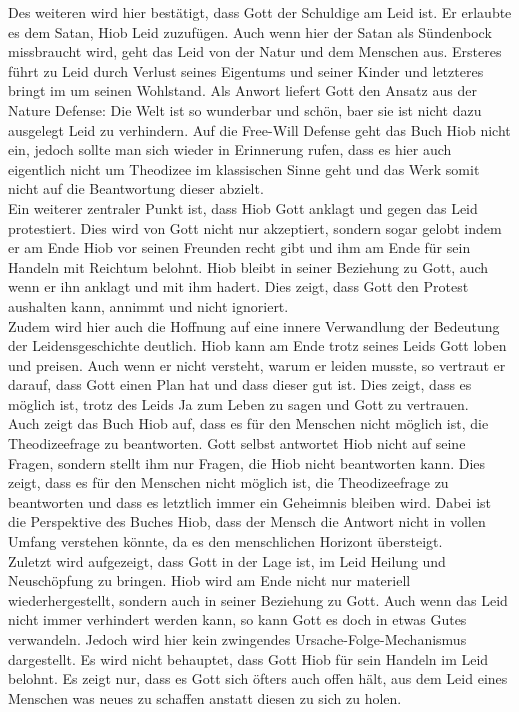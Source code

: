 Des weiteren wird hier bestätigt, dass Gott der Schuldige am Leid ist. Er erlaubte es dem Satan, Hiob Leid zuzufügen. Auch wenn hier der Satan als Sündenbock missbraucht wird, geht das Leid von der Natur und dem Menschen aus. Ersteres führt zu Leid durch Verlust seines Eigentums und seiner Kinder und letzteres bringt im um seinen Wohlstand. Als Anwort liefert Gott den Ansatz aus der Nature Defense: Die Welt ist so wunderbar und schön, baer sie ist nicht dazu ausgelegt Leid zu verhindern. Auf die Free-Will Defense geht das Buch Hiob nicht ein, jedoch sollte man sich wieder in Erinnerung rufen, dass es hier auch eigentlich nicht um Theodizee im klassischen Sinne geht und das Werk somit nicht auf die Beantwortung dieser abzielt. \\

Ein weiterer zentraler Punkt ist, dass Hiob Gott anklagt und gegen das Leid protestiert. Dies wird von Gott nicht nur akzeptiert, sondern sogar gelobt indem er am Ende Hiob vor seinen Freunden recht gibt und ihm am Ende für sein Handeln mit Reichtum belohnt. Hiob bleibt in seiner Beziehung zu Gott, auch wenn er ihn anklagt und mit ihm hadert. Dies zeigt, dass Gott den Protest aushalten kann, annimmt und nicht ignoriert. \\

Zudem wird hier auch die Hoffnung auf eine innere Verwandlung der Bedeutung der Leidensgeschichte deutlich. Hiob kann am Ende trotz seines Leids Gott loben und preisen. Auch wenn er nicht versteht, warum er leiden musste, so vertraut er darauf, dass Gott einen Plan hat und dass dieser gut ist. Dies zeigt, dass es möglich ist, trotz des Leids Ja zum Leben zu sagen und Gott zu vertrauen.\\

Auch zeigt das Buch Hiob auf, dass es für den Menschen nicht möglich ist, die Theodizeefrage zu beantworten. Gott selbst antwortet Hiob nicht auf seine Fragen, sondern stellt ihm nur Fragen, die Hiob nicht beantworten kann. Dies zeigt, dass es für den Menschen nicht möglich ist, die Theodizeefrage zu beantworten und dass es letztlich immer ein Geheimnis bleiben wird. Dabei ist die Perspektive des Buches Hiob, dass der Mensch  die Antwort nicht in vollen Umfang verstehen könnte, da es den menschlichen Horizont übersteigt.\\

Zuletzt wird aufgezeigt, dass Gott in der Lage ist, im Leid Heilung und Neuschöpfung zu bringen. Hiob wird am Ende nicht nur materiell wiederhergestellt, sondern auch in seiner Beziehung zu Gott. Auch wenn das Leid nicht immer verhindert werden kann, so kann Gott es doch in etwas Gutes verwandeln. Jedoch wird hier kein zwingendes Ursache-Folge-Mechanismus dargestellt. Es wird nicht behauptet, dass Gott Hiob für sein Handeln im Leid belohnt. Es zeigt nur, dass es Gott sich öfters auch offen hält, aus dem Leid eines Menschen was neues zu schaffen anstatt diesen zu sich zu holen.\\

